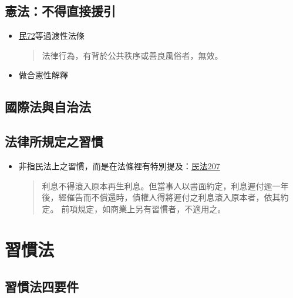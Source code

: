 \documentclass[
]{book}
\begin{document}
\hypertarget{ux61b2ux6cd5ux4e0dux5f97ux76f4ux63a5ux63f4ux5f15}{%
\subsection{憲法：不得直接援引}\label{ux61b2ux6cd5ux4e0dux5f97ux76f4ux63a5ux63f4ux5f15}}

\begin{itemize}
\item
  \href{https://law.moj.gov.tw/LawClass/LawSingle.aspx?pcode=B0000001\&flno=72}{民72}等過渡性法條

  \begin{quote}
  法律行為，有背於公共秩序或善良風俗者，無效。
  \end{quote}
\item
  做合憲性解釋
\end{itemize}

\hypertarget{ux570bux969bux6cd5ux8207ux81eaux6cbbux6cd5}{%
\subsection{國際法與自治法}\label{ux570bux969bux6cd5ux8207ux81eaux6cbbux6cd5}}

\pagebreak

\hypertarget{ux6cd5ux5f8bux6240ux898fux5b9aux4e4bux7fd2ux6163}{%
\subsection{法律所規定之習慣}\label{ux6cd5ux5f8bux6240ux898fux5b9aux4e4bux7fd2ux6163}}

\begin{itemize}
\item
  非指民法上之習慣，而是在法條裡有特別提及：\href{https://law.moj.gov.tw/LawClass/LawSingle.aspx?pcode=B0000001\&flno=207}{民法207}

  \begin{quote}
  利息不得滾入原本再生利息。但當事人以書面約定，利息遲付逾一年後，經催告而不償還時，債權人得將遲付之利息滾入原本者，依其約定。
  前項規定，如商業上另有習慣者，不適用之。
  \end{quote}
\end{itemize}

\hypertarget{ux7fd2ux6163ux6cd5}{%
\section{習慣法}\label{ux7fd2ux6163ux6cd5}}

\hypertarget{ux7fd2ux6163ux6cd5ux56dbux8981ux4ef6}{%
\subsection{習慣法四要件}\label{ux7fd2ux6163ux6cd5ux56dbux8981ux4ef6}}
\end{document}
